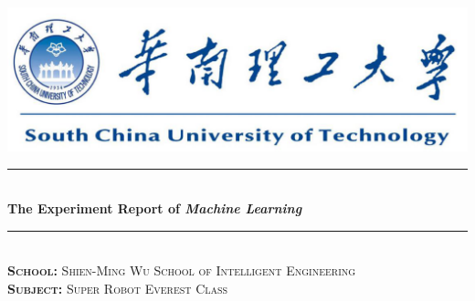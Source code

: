\documentclass[journal, a4paper]{IEEEtran}
\begin{document}
\begin{titlepage}

\newcommand{\HRule}{\rule{\linewidth}{0.5mm}} %

\center %

~\\[1cm]
\includegraphics{SCUT.png}\\[2cm] %


\HRule \\[1cm]
{ \huge \bfseries The Experiment Report of \textit{Machine Learning} }\\[0.6cm] %
\HRule \\[2cm]


\textsc{\LARGE \textbf{School:} Shien-Ming Wu School of Intelligent Engineering}\\[1cm]
\textsc{\LARGE \textbf{Subject:} Super Robot Everest Class}\\[2cm]




\end{titlepage}
\end{document}
